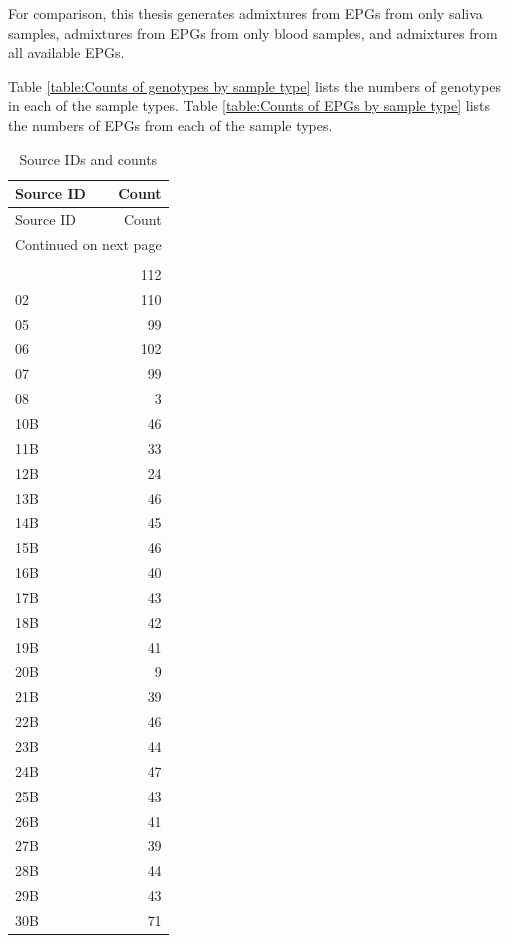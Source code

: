 For comparison, this thesis generates admixtures from EPGs from only saliva samples, admixtures from EPGs from only blood samples, and admixtures from all available EPGs.

Table \ref{table:Counts of genotypes by sample type} lists the numbers of genotypes in each of the sample types. Table \ref{table:Counts of EPGs by sample type} lists the numbers of EPGs from each of the sample types.

\begin{longtable}{lr}
\toprule
Source ID & Count \\
\midrule
\endfirsthead
\toprule
Source ID & Count \\
\midrule
\endhead
\midrule
\multicolumn{2}{r}{{Continued on next page}} \\
\midrule
\endfoot
\bottomrule
\caption{Source IDs and counts}
\label{table:Source IDs and counts}\\
\endlastfoot
       01 &   112 \\
       02 &   110 \\
       05 &    99 \\
       06 &   102 \\
       07 &    99 \\
       08 &     3 \\
      10B &    46 \\
      11B &    33 \\
      12B &    24 \\
      13B &    46 \\
      14B &    45 \\
      15B &    46 \\
      16B &    40 \\
      17B &    43 \\
      18B &    42 \\
      19B &    41 \\
      20B &     9 \\
      21B &    39 \\
      22B &    46 \\
      23B &    44 \\
      24B &    47 \\
      25B &    43 \\
      26B &    41 \\
      27B &    39 \\
      28B &    44 \\
      29B &    43 \\
      30B &    71 \\

\end{longtable}
